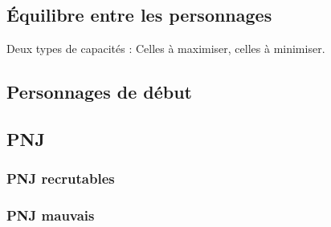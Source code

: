 \subsection{Équilibre entre les personnages}
Deux types de capacités : Celles à maximiser, celles à minimiser.
\subsection{Personnages de début}
\subsection{PNJ}
\subsubsection{PNJ recrutables}
\subsubsection{PNJ mauvais}